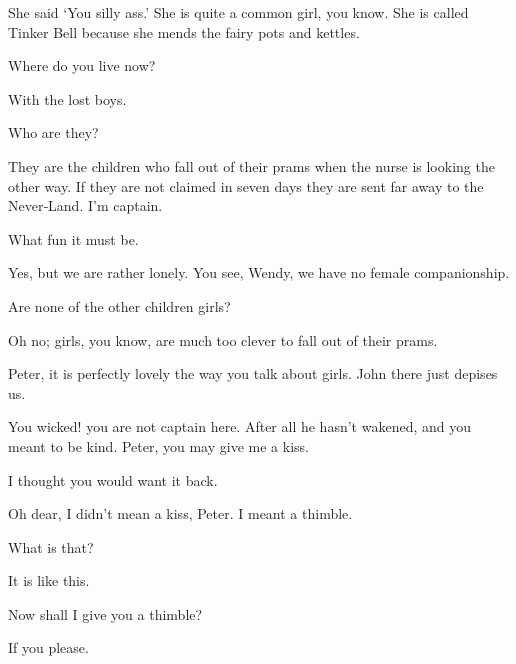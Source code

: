 \begin{drama}
\peterspeaks
She said ‘You silly ass.’
She is quite a common girl, you know.
She is called Tinker Bell because she mends the fairy pots and kettles.


\wendyspeaks
Where do you live now?

\peterspeaks
With the lost boys.

\wendyspeaks
Who are they?

\peterspeaks
They are the children who fall out of their prams when the nurse is looking the other way.
If they are not claimed in seven days they are sent far away to the Never‐Land.
I’m captain.

\wendyspeaks
What fun it must be.

Yes, but we are rather lonely.
You see, Wendy, we have no female companionship.

\wendyspeaks
Are none of the other children girls?

\peterspeaks
Oh no; girls, you know, are much too clever to fall out of their prams.

\wendyspeaks
Peter, it is perfectly lovely the way you talk about girls.
John there just depises us.


\speakercontinues
You wicked!
you are not captain here.
After all he hasn’t wakened, and you meant to be kind.
Peter, you may give me a kiss.

I thought you would want it back.

Oh dear, I didn’t mean a kiss, Peter.
I meant a thimble.

What is that?

\wendyspeaks
It is like this.

Now shall I give you a thimble?

\wendyspeaks
If you please.


\end{drama}
